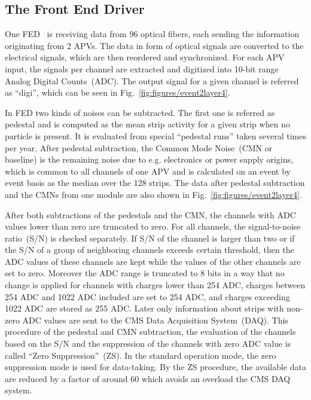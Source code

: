 
\subsection{The Front End Driver \label{sec:FED}}
One FED~\cite{Baird:2002wg} is receiving data from 96 optical fibers, each sending the information originating from 2 APVs. The data in form of optical signals are converted to the electrical signals, which are then reordered and synchronized. For each APV input, the signals per channel are extracted and digitized into 10-bit range Analog Digital Counts~(ADC). The output signal for a given channel is referred as ``digi'', which can be seen in Fig.~\ref{fig:figures/event2layer4}.

In FED two kinds of noises can be subtracted. The first one is referred as pedestal and is computed as the mean strip activity for a given strip when no particle is present. It is evaluated from special ``pedestal runs'' taken several times per year. After pedestal subtraction, the Common Mode Noise~(CMN or baseline) is the remaining noise due to e.g. electronics or power supply origins, which is common to all channels of one APV and is calculated on an event by event basis as the median over the 128 strips. The data after pedestal subtraction and the CMNs from one module are also shown in Fig.~\ref{fig:figures/event2layer4}. 

After both subtractions of the pedestals and the CMN, the channels with ADC values lower than zero are truncated to zero. For all channels, the signal-to-noise ratio~(S/N) is checked separately. If S/N of the channel is larger than two or if the S/N of a group of neighboring channels exceeds certain threshold, then the ADC values of these channels are kept while the values of the other channels are set to zero. Moreover the ADC range is truncated to 8 bits in a way that no change is applied for channels with charges lower than 254 ADC, charges between 254 ADC and 1022 ADC included are set to 254 ADC, and charges exceeding 1022 ADC are stored as 255 ADC. Later only information about strips with non-zero ADC values are sent to the CMS Data Acquisition System~(DAQ).  This procedure of the pedestal and CMN subtraction, the evaluation of the channels based on the S/N and the suppression of the channels with zero ADC value is called ``Zero Suppression''~(ZS). In the standard operation mode, the zero suppression mode is used for data-taking. By the ZS procedure, the available data are reduced by a factor of around 60 which avoids an overload the CMS DAQ system.


